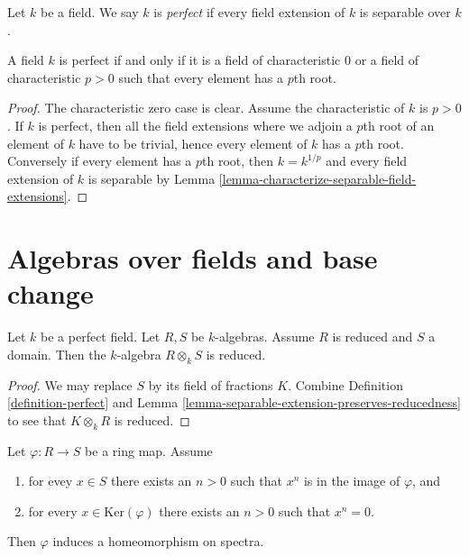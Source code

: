 \begin{definition}
\label{definition-perfect}
Let $k$ be a field. We say $k$ is {\it perfect}
if every field extension of $k$ is separable over $k$.
\end{definition}

\begin{lemma}
\label{lemma-perfect}
A field $k$ is perfect if and only if it is a field of characteristic $0$
or a field of characteristic $p > 0$ such that every element has a $p$th
root.
\end{lemma}

\begin{proof}
The characteristic zero case is clear.
Assume the characteristic of $k$ is $p > 0$.
If $k$ is perfect, then all the field extensions where we adjoin
a $p$th root of an element of $k$ have to be trivial, hence every
element of $k$ has a $p$th root. Conversely if every element has a $p$th
root, then $k = k^{1/p}$ and every field extension of $k$ is
separable by
Lemma \ref{lemma-characterize-separable-field-extensions}.
\end{proof}











\section{Algebras over fields and base change}
\label{section-algebras-over-fields}


\begin{lemma}
\label{lemma-perfect-reduced}
Let $k$ be a perfect field. Let $R, S$ be $k$-algebras.
Assume $R$ is reduced and $S$ a domain.
Then the $k$-algebra $R \otimes_k S$ is reduced.
\end{lemma}

\begin{proof}
We may replace $S$ by its field of fractions $K$.
Combine Definition \ref{definition-perfect} and
Lemma \ref{lemma-separable-extension-preserves-reducedness}
to see that $K \otimes_k R$ is reduced.
\end{proof}

\begin{lemma}
\label{lemma-p-ring-map}
Let $\varphi : R \to S$ be a ring map. Assume
\begin{enumerate}
\item for evey $x \in S$ there exists an $n > 0$ such that
$x^n$ is in the image of $\varphi$, and
\item for every $x \in \text{Ker}(\varphi)$ there exists
an $n > 0$ such that $x^n = 0$.
\end{enumerate}
Then $\varphi$ induces a homeomorphism on spectra.
\end{lemma}

